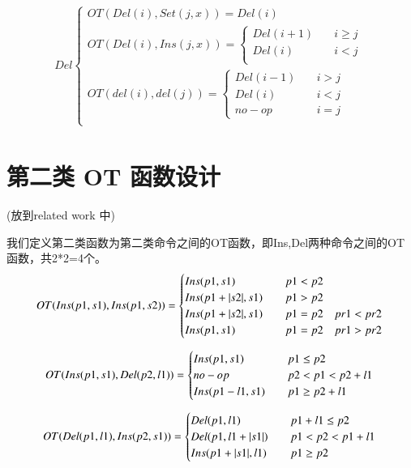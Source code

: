 \begin{equation}
\begin{aligned}
Del \begin{cases}
OT(Del (i), Set (j,x)) =
	{Del(i)}\\
OT(Del (i), Ins (j,x)) =\begin{cases}
	{Del (i+1)}  \quad &i \ge j\\
	{Del (i)}   \quad &i < j\\ \end{cases}\\
OT(del (i), del (j)) =\begin{cases}
	{Del (i-1)} \quad &i > j\\
	{Del (i)} \quad &i < j\\
	{no-op}   \quad &i = j \end{cases}\\
\end{cases}
\end{aligned}
\end{equation}

\section{第二类 OT 函数设计}
(放到related work 中)

我们定义第二类函数为第二类命令之间的OT函数，即Ins,Del两种命令之间的OT函数，共2*2=4个。
\begin{equation}
OT(Ins(p1,s1),Ins(p1,s2))= \begin{cases}
Ins(p1,s1) \quad & p1<p2 \\
Ins(p1+ |s2|,s1) \quad & p1>p2 \\
Ins(p1+ |s2|,s1) \quad & p1=p2 \quad pr1<pr2 \\
Ins(p1,s1) \quad & p1=p2 \quad pr1>pr2
 \end{cases}\\
\end{equation}

\begin{equation}
OT(Ins(p1,s1),Del(p2,l1))= \begin{cases}
Ins(p1,s1) \quad & p1 \le p2 \\
no-op \quad & p2<p1<p2+l1\\
Ins(p1-l1,s1) \quad & p1 \ge p2+l1 \end{cases}\\
\end{equation}

\begin{equation}
OT(Del(p1,l1),Ins(p2,s1))= \begin{cases}
Del(p1,l1) \quad & p1 + l1 \le p2 \\
Del(p1,l1+|s1|) \quad & p1<p2<p1+l1 \\
Ins(p1+ |s1|,l1) \quad & p1 \ge p2 \end{cases}\\
\end{equation}

